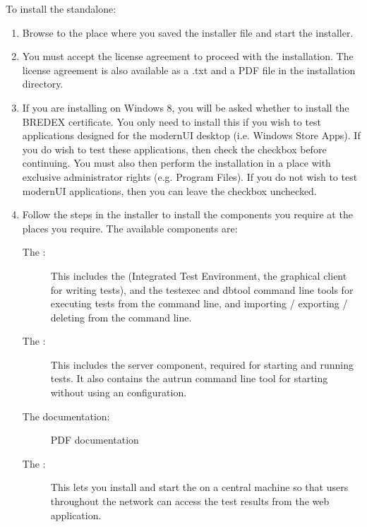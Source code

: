 To install the standalone:

\begin{enumerate}
\item Browse to the place where you saved the installer file and start the installer.
\item You must accept the license agreement to proceed with the installation. The license agreement is also available as a .txt and a PDF file in the installation directory.
\item If you are installing on Windows 8, you will be asked whether to install the BREDEX certificate. You only need to install this if you wish to test applications designed for the modernUI desktop (i.e. Windows Store Apps). If you do wish to test these applications, then check the checkbox before continuing. You must also then perform the installation in a place with exclusive administrator rights (e.g. Program Files). If you do not wish to test modernUI applications, then you can leave the checkbox unchecked.
\item Follow the steps in the installer to install the components you require at the places you require. The available components are:
\begin{description}
\item [The \ite{}:]{This includes the \ite{} (Integrated Test Environment, the graphical client for writing tests), and the testexec and dbtool command line tools for executing tests from the command line, and importing / exporting / deleting \gdprojects{} from the command line.}
\item [The \gdagent{}:]{This includes the server component, required for starting \gdauts{} and running tests. It also contains the autrun command line tool for starting \gdauts{} without using an \gdaut{} configuration.}
\item [The documentation:]{PDF documentation}
\item [The \dash{}:]{This lets you install and start the \dash{} on a central machine so that users throughout the network can access the test results from the web application. }
\end{description}
\end{enumerate}
